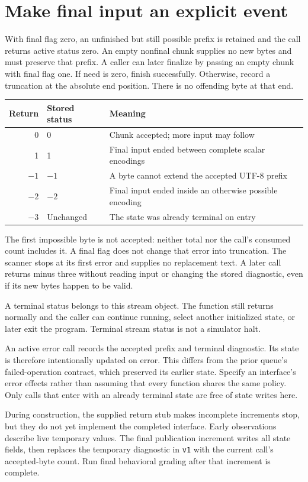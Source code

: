 \section{Make final input an explicit event}
With final flag zero, an unfinished but still possible prefix is retained and the
call returns active status zero. An empty nonfinal chunk supplies no new bytes and
must preserve that prefix. A caller can later finalize by passing an empty chunk
with final flag one. If need is zero, finish successfully. Otherwise, record a
truncation at the absolute end position. There is no offending byte at that end.

\begin{longtable}{rlp{91mm}}
  \toprule Return & Stored status & Meaning                                                 \\\midrule
  0               & 0             & Chunk accepted; more input may follow                   \\
  1               & 1             & Final input ended between complete scalar encodings     \\
  \(-1\)          & \(-1\)        & A byte cannot extend the accepted UTF-8 prefix          \\
  \(-2\)          & \(-2\)        & Final input ended inside an otherwise possible encoding \\
  \(-3\)          & Unchanged     & The state was already terminal on entry                 \\\bottomrule
\end{longtable}
The first impossible byte is not accepted: neither total nor the call's consumed
count includes it. A final flag does not change that error into truncation. The
scanner stops at its first error and supplies no replacement text. A later call
returns minus three without reading input or changing the stored diagnostic, even
if its new bytes happen to be valid.

A terminal status belongs to this stream object. The function still returns
normally and the caller can continue running, select another initialized state,
or later exit the program. Terminal stream status is not a simulator halt.

An active error call records the accepted prefix and terminal diagnostic. Its
state is therefore intentionally updated on error. This differs from the prior
queue's failed-operation contract, which preserved its earlier state. Specify an
interface's error effects rather than assuming that every function shares the same
policy. Only calls that enter with an already terminal state are free of state
writes here.

During construction, the supplied return stub makes incomplete increments stop,
but they do not yet implement the completed interface. Early observations describe
live temporary values. The final publication increment writes all state fields,
then replaces the temporary diagnostic in \texttt{v1} with the current call's
accepted-byte count. Run final behavioral grading after that increment is complete.
